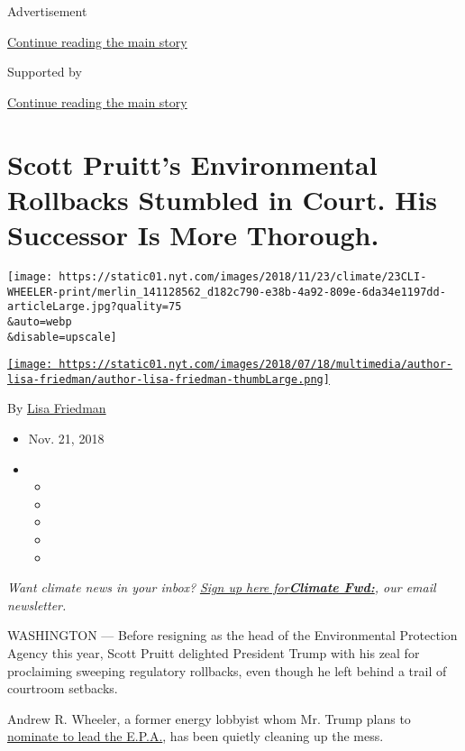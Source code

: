 Advertisement

\protect\hyperlink{after-top}{Continue reading the main story}

Supported by

\protect\hyperlink{after-sponsor}{Continue reading the main story}

\hypertarget{scott-pruitts-environmental-rollbacks-stumbled-in-court-his-successor-is-more-thorough}{%
\section{Scott Pruitt's Environmental Rollbacks Stumbled in Court. His
Successor Is More
Thorough.}\label{scott-pruitts-environmental-rollbacks-stumbled-in-court-his-successor-is-more-thorough}}

\texttt{[image: https://static01.nyt.com/images/2018/11/23/climate/23CLI-WHEELER-print/merlin\_141128562\_d182c790-e38b-4a92-809e-6da34e1197dd-articleLarge.jpg?quality=75\\\&auto=webp\\\&disable=upscale]}

\href{https://www.nytimes.com/by/lisa-friedman}{\texttt{[image: https://static01.nyt.com/images/2018/07/18/multimedia/author-lisa-friedman/author-lisa-friedman-thumbLarge.png]}}

By \href{https://www.nytimes.com/by/lisa-friedman}{Lisa Friedman}

\begin{itemize}
\item
  Nov. 21, 2018
\item
  \begin{itemize}
  \item
  \item
  \item
  \item
  \item
  \end{itemize}
\end{itemize}

\emph{Want climate news in your inbox?}
\href{https://www.nytimes.com/newsletters/climate-change}{\emph{Sign up
here
for}}\textbf{\href{https://www.nytimes.com/newsletters/climate-change}{\emph{Climate
Fwd:}}}\emph{, our email newsletter.}

WASHINGTON --- Before resigning as the head of the Environmental
Protection Agency this year, Scott Pruitt delighted President Trump with
his zeal for proclaiming sweeping regulatory rollbacks, even though he
left behind a trail of courtroom setbacks.

Andrew R. Wheeler, a former energy lobbyist whom Mr. Trump plans to
\href{https://www.nytimes.com/2018/11/16/climate/trump-andrew-wheeler-epa.html}{nominate
to lead the E.P.A.}, has been quietly cleaning up the mess.

